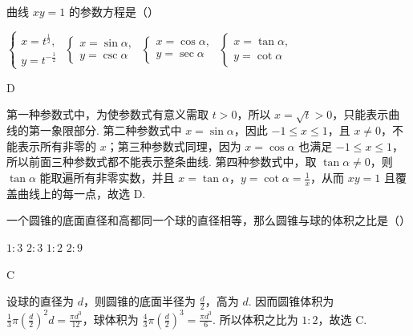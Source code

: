 \begin{problem}
曲线 \(xy=1\) 的参数方程是（\quad）

\choices
    {\(\begin{cases}
        x=t^{\frac{1}{2}},\\
        y=t^{-\frac{1}{2}}
    \end{cases}\)}
    {\(\begin{cases}
        x=\sin\alpha,\\
        y=\csc\alpha
    \end{cases}\)}
    {\(\begin{cases}
        x=\cos\alpha,\\
        y=\sec\alpha
    \end{cases}\)}
    {\(\begin{cases}
        x=\tan\alpha,\\
        y=\cot\alpha
    \end{cases}\)}
\end{problem}

\begin{answer}
D
\end{answer}

\begin{solution}
第一种参数式中，为使参数式有意义需取 \(t>0\)，所以 \(x=\sqrt{t}>0\)，只能表示曲线的第一象限部分. 第二种参数式中 \(x=\sin\alpha\)，因此 \(-1\leq x\leq1\)，且 \(x\neq0\)，不能表示所有非零的 \(x\)；第三种参数式同理，因为 \(x=\cos\alpha\) 也满足 \(-1\leq x\leq1\)，所以前面三种参数式都不能表示整条曲线. 第四种参数式中，取 \(\tan\alpha\neq0\)，则 \(\tan\alpha\) 能取遍所有非零实数，并且 \(x=\tan\alpha\)，\(y=\cot\alpha=\frac{1}{x}\)，从而 \(xy=1\) 且覆盖曲线上的每一点，故选 D.
\end{solution}

\begin{problem}
一个圆锥的底面直径和高都同一个球的直径相等，那么圆锥与球的体积之比是（\quad）

\choices
    {\(1:3\)}
    {\(2:3\)}
    {\(1:2\)}
    {\(2:9\)}
\end{problem}

\begin{answer}
C
\end{answer}

\begin{solution}
设球的直径为 \(d\)，则圆锥的底面半径为 \(\frac{d}{2}\)，高为 \(d\). 因而圆锥体积为 \(\frac{1}{3}\pi\left(\frac{d}{2}\right)^{2}d=\frac{\pi d^{3}}{12}\)，球体积为 \(\frac{4}{3}\pi\left(\frac{d}{2}\right)^{3}=\frac{\pi d^{3}}{6}\). 所以体积之比为 \(1:2\)，故选 C.
\end{solution}

